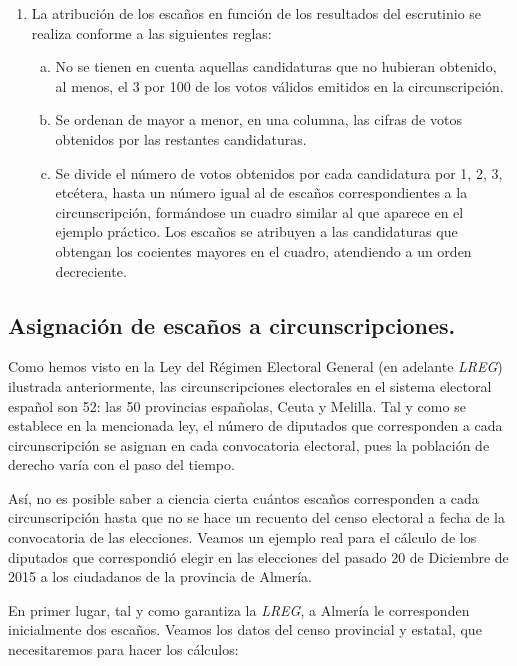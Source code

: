 \documentclass[11pt]{article}
\begin{document}
{\begin{leftbar}
		\begin{enumerate}
			\item La atribución de los escaños en función de los resultados del escrutinio se realiza conforme a las siguientes reglas:
			\begin{enumerate}[a)]
					\item No se tienen en cuenta aquellas candidaturas que no hubieran obtenido, al menos, el 3 por 100 de los votos válidos emitidos en la circunscripción.
					\item Se ordenan de mayor a menor, en una columna, las cifras de votos obtenidos por las restantes candidaturas.
					\item Se divide el número de votos obtenidos por cada candidatura por 1, 2, 3, etcétera, hasta un número igual al de escaños correspondientes a la circunscripción, formándose un cuadro similar al que aparece en el ejemplo práctico. Los escaños se atribuyen a las candidaturas que obtengan los cocientes mayores en el cuadro, atendiendo a un orden decreciente.
				\end{enumerate}
		\end{enumerate}

	\end{leftbar}
	}
	
	\subsection	{Asignación de escaños a circunscripciones.}
	
	Como hemos visto en la Ley del Régimen Electoral General (en adelante \textit{LREG}) ilustrada anteriormente, las circunscripciones electorales en el sistema electoral español son 52: las 50 provincias españolas, Ceuta y Melilla. Tal y como se establece en la mencionada ley, el número de diputados que corresponden a cada circunscripción se asignan en cada convocatoria electoral, pues la población de derecho varía con el paso del tiempo.
	
	Así, no es posible saber a ciencia cierta cuántos escaños corresponden a cada circunscripción hasta que no se hace un recuento del censo electoral a fecha de la convocatoria de las elecciones. Veamos un ejemplo real para el cálculo de los diputados que correspondió elegir en las elecciones del pasado 20 de Diciembre de 2015 a los ciudadanos de la provincia de Almería.
	
	En primer lugar, tal y como garantiza la \textit{LREG}, a Almería le corresponden inicialmente dos escaños. Veamos los datos del censo provincial y estatal, que necesitaremos para hacer los cálculos:
	
\end{document}
